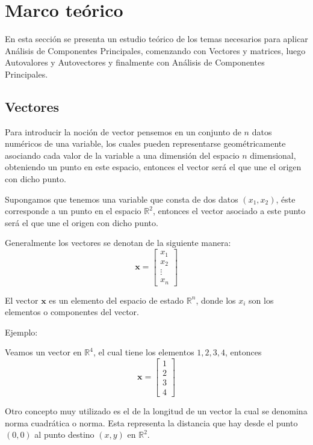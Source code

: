 \documentclass[12pt,letterpaper]{report} %
\begin{document}
\newpage

\chapter{Marco teórico}

En esta sección se presenta un estudio teórico de los temas necesarios para aplicar Análisis de Componentes Principales, comenzando con Vectores y matrices, luego Autovalores y Autovectores y finalmente con Análisis de Componentes Principales.

\section{Vectores}

Para introducir la noción de vector pensemos en un conjunto de $n$ datos numéricos de una variable, los cuales pueden representarse geométricamente asociando cada valor de la variable a una dimensión del espacio $n$ dimensional, obteniendo un punto en este espacio, entonces el vector será el que une el origen con dicho punto. 

Supongamos que tenemos una variable que consta de dos datos $(x_1,x_2)$, éste corresponde a un punto en el espacio $\mathbb{R}^2$, entonces el vector asociado a este punto será el que une el origen con dicho punto.

Generalmente los vectores se denotan de la siguiente manera:
$$
\mathbf{x}=
\begin{bmatrix} 
x_1 \\ 
x_2 \\ 
\vdots 
\\ 
x_n
\end{bmatrix}
$$

El vector $\mathbf{x}$ es un elemento del espacio de estado $\mathbb{R}^n$, donde los $x_i$ son los elementos o componentes del vector.

Ejemplo:

Veamos un vector en $\mathbb{R}^4$, el cual tiene los elementos $1,2,3,4$, entonces
$$
\mathbf{x}=
\begin{bmatrix}
1 \\ 
2 \\ 
3 \\ 
4
\end{bmatrix}
$$

Otro concepto muy utilizado es el de la longitud de un vector la cual se denomina norma cuadrática o norma. Esta representa la distancia que hay desde el punto $(0,0)$ al punto destino $(x,y)$ en $\mathbb{R}^2$.
\end{document}
